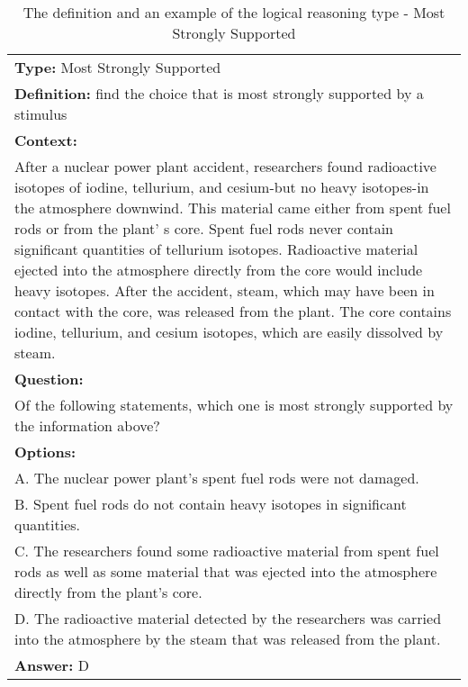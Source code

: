 \documentclass{article} \usepackage{iclr2020_conference,times}
\begin{document}
\begin{table}
	\small
	\centering
	\caption{The definition and an example of the logical reasoning type - Most Strongly Supported}
	\begin{tabular}{|p{}|}
		\hline
		{\bf Type: }Most Strongly Supported \\
		{\bf Definition: }find the choice that is most strongly supported by a stimulus\\
		\hline
        {\bf Context:} \\
        After a nuclear power plant accident, researchers found radioactive isotopes of iodine, tellurium, and cesium-but no heavy isotopes-in the atmosphere downwind. This material came either from spent fuel rods or from the plant' s core. Spent fuel rods never contain significant quantities of tellurium isotopes. Radioactive material ejected into the atmosphere directly from the core would include heavy isotopes. After the accident, steam, which may have been in contact with the core, was released from the plant. The core contains iodine, tellurium, and cesium isotopes, which are easily dissolved by steam.\\
        {\bf Question:}\\
        Of the following statements, which one is most strongly supported by the information above?\\
        {\bf Options:}\\
        A. The nuclear power plant's spent fuel rods were not damaged.\\
        B. Spent fuel rods do not contain heavy isotopes in significant quantities.\\
        C. The researchers found some radioactive material from spent fuel rods as well as some material that was ejected into the atmosphere directly from the plant's core.\\
        D. The radioactive material detected by the researchers was carried into the atmosphere by the steam that was released from the plant.\\
        {\bf Answer: }D\\
		\hline
	\end{tabular}
	\label{tab:most-strongly-supported}
\end{table}
\end{document}
